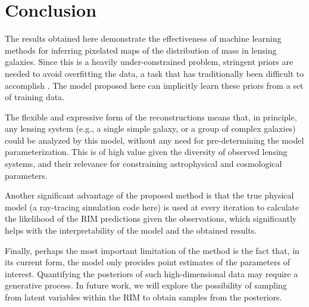 \section{Conclusion}\label{sec:conclusion}


The results obtained here demonstrate the effectiveness of machine learning methods for inferring pixelated maps of the distribution of mass in lensing galaxies. Since this is a heavily under-constrained problem, stringent priors are needed to avoid overfitting the data, a task that has traditionally been difficult to accomplish \citep[e.g.,][]{Saha1997}. The model proposed here can implicitly learn these priors from a set of training data. 

The flexible and expressive form of the reconstructions means that, in principle, any lensing system (e.g., a single simple galaxy, or a group of complex galaxies) could be analyzed by this model, without any need for pre-determining the model parameterization. This is of high value given the diversity of observed lensing systems, and their relevance for constraining astrophysical and cosmological parameters. 

Another significant advantage of the proposed method is that the true physical model (a ray-tracing simulation code here) is used at every iteration to calculate the likelihood of the RIM predictions given the observations, which significantly helps with the interpretability of the model and the obtained results. 

Finally, perhaps the most important limitation of the method is the fact that, in its current form, the model only provides point estimates of the parameters of interest. Quantifying the posteriors of such high-dimensional data may require a generative process. In future work, we will explore the possibility of sampling from latent variables within the RIM to obtain samples from the posteriors.  

